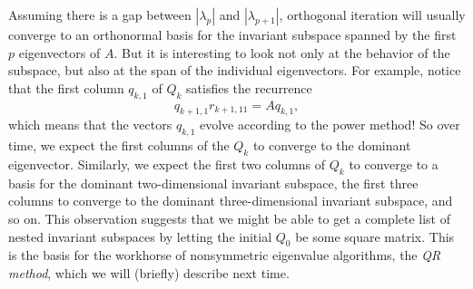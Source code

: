 \documentclass[12pt, leqno]{article} %
\begin{document}
Assuming there is a gap between $|\lambda_{p}|$ and $|\lambda_{p+1}|$,
orthogonal iteration will usually converge to an orthonormal basis
for the invariant subspace spanned by the first $p$ eigenvectors of $A$.
But it is interesting to look not only at the behavior of the subspace,
but also at the span of the individual eigenvectors.  For example,
notice that the first column $q_{k,1}$ of $Q_k$ satisfies the recurrence
\[
  q_{k+1,1} r_{k+1,11} = A q_{k,1},
\]
which means that the vectors $q_{k,1}$ evolve according to the power method!
So over time, we expect the first columns of the $Q_k$ to converge to the
dominant eigenvector.  Similarly, we expect the first two columns of $Q_k$
to converge to a basis for the dominant two-dimensional invariant subspace,
the first three columns to converge to the dominant three-dimensional
invariant subspace, and so on.  This observation suggests that we might be
able to get a complete list of nested invariant subspaces by letting the
initial $Q_0$ be some square matrix.  This is the basis for the workhorse
of nonsymmetric eigenvalue algorithms, the {\em QR method}, which we will
(briefly) describe next time.
\end{document}
